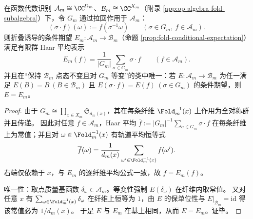 \begin{theorem}\label{thm:op-algebra-fold-conditional-expectation-haar}
在函数代数识别 \(\mathcal A_m\cong\CC^{\Omega_m}\)、\(\mathcal B_m\cong\CC^{X_m}\)（附录 \ref{app:op-algebra-fold-subalgebra}）下，令 \(G_m\) 通过拉回作用于 \(\mathcal A_m\)：
\[
(\sigma\cdot f)(\omega):=f(\sigma^{-1}\omega)\qquad(\sigma\in G_m,\ f\in\mathcal A_m).
\]
则折叠诱导的条件期望 \(E_m:\mathcal A_m\to\mathcal B_m\)（命题 \ref{prop:fold-conditional-expectation}）满足有限群 Haar 平均表示
\[
\boxed{\;
E_m(f)=\frac{1}{|G_m|}\sum_{\sigma\in G_m}\sigma\cdot f\qquad(f\in\mathcal A_m).\;}
\]
并且在“保持 \(\mathcal B_m\) 点态不变且对 \(G_m\) 等变”的类中唯一：若 \(E:\mathcal A_m\to\mathcal B_m\) 为任一满足
\(
E(B)=B\ (B\in\mathcal B_m)
\)
且
\(
E(\sigma\cdot f)=E(f)\ (\sigma\in G_m)
\)
的条件期望，则 \(E=E_m\)。
\end{theorem}
\begin{proof}
由于 \(G_m\cong\prod_{x\in X_m}\mathfrak S_{d_m(x)}\)，其在每条纤维 \(\Fold_m^{-1}(x)\) 上作用为全对称群并且传递。
因此对任意 \(f\in\mathcal A_m\)，Haar 平均
\(
\overline f:=|G_m|^{-1}\sum_{\sigma\in G_m}\sigma\cdot f
\)
在每条纤维上为常值；并且对 \(\omega\in\Fold_m^{-1}(x)\) 有轨道平均恒等式
\[
\overline f(\omega)=\frac{1}{d_m(x)}\sum_{\omega'\in\Fold_m^{-1}(x)}f(\omega').
\]
右端仅依赖于 \(x\)，与 \(E_m\) 的逐纤维平均公式一致，故 \(\overline f=E_m(f)\)。
\par
唯一性：取点质量基函数 \(\delta_\omega\in\mathcal A_m\)。等变性强制 \(E(\delta_\omega)\) 在纤维内取常值。
又对任意 \(x\) 有 \(\sum_{\omega\in\Fold_m^{-1}(x)}\delta_\omega\) 在纤维上恒等为 \(1\)，由 \(E\) 的保单位性与 \(E|_{\mathcal B_m}=\mathrm{id}\) 得该常值必为 \(1/d_m(x)\)。
于是 \(E\) 与 \(E_m\) 在基上相同，从而 \(E=E_m\)。证毕。
\end{proof}



